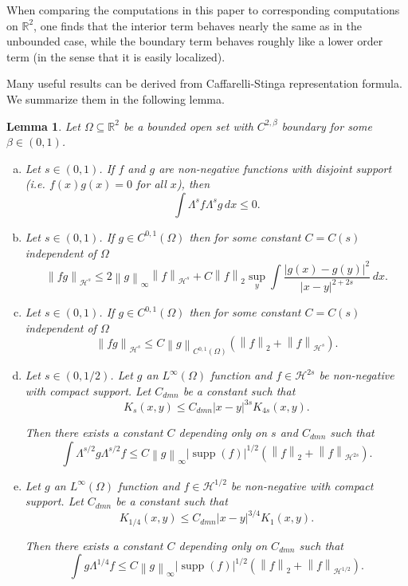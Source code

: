 \documentclass[11pt]{amsart}
\newtheorem{lemma}[theorem]{Lemma}
\theoremstyle{remark}
\theoremstyle{definition}
\newcommand{\R}{\mathbb{R}}
\newcommand{\norm}[1]{\left\lVert#1\right\rVert}
\newcommand{\paren}[1]{\left( #1 \right)}
\DeclareMathOperator{\supp}{supp}
\newcommand{\HD}{\mathcal{H}}
\newcommand{\Comega}{C_\mathit{dmn}}
\begin{document}
When comparing the computations in this paper to corresponding computations on $\R^2$, one finds that the interior term behaves nearly the same as in the unbounded case, while the boundary term behaves roughly like a lower order term (in the sense that it is easily localized).  

Many useful results can be derived from Caffarelli-Stinga representation formula.  We summarize them in the following lemma.  

\begin{lemma} \label{thm:Lambda stuff}
Let $\Omega \subseteq \R^2$ be a bounded open set with $C^{2,\beta}$ boundary for some $\beta \in (0,1)$.  

\begin{enumerate}[(a)]
\item \label{thm:disjoint} Let $s \in (0,1)$.  If $f$ and $g$ are non-negative functions with disjoint support (i.e. $f(x)g(x) = 0$ for all $x$), then 
\[ \int \Lambda^s f \Lambda^s g \,dx \leq 0. \]

\item \label{thm:product rule} Let $s \in (0,1)$.  If $g \in C^{0,1}(\Omega)$ then for some constant $C = C(s)$ independent of $\Omega$
\[ \norm{fg}_{\HD^s} \leq 2 \norm{g}_\infty \norm{f}_{\HD^s} + C \norm{f}_2 \sup_y \int \frac{|g(x)-g(y)|^2}{|x-y|^{2+2s}} \,dx. \]

\item \label{thm:extra product rule} Let $s \in (0,1)$.  If $g \in C^{0,1}(\Omega)$ then for some constant $C=C(s)$ independent of $\Omega$
\[  \norm{fg}_{\HD^s} \leq C \norm{g}_{C^{0,1}(\Omega)} \paren{\norm{f}_2 + \norm{f}_{\HD^s}}. \]

\item \label{thm:L1 of Lambda bounded} Let $s\in(0,1/2)$.  Let $g$ an $L^\infty(\Omega)$ function and $f \in \HD^{2s}$ be non-negative with compact support.  Let $\Comega$ be a constant such that
\begin{equation} \label{K bounded between orders} K_s(x,y) \leq \Comega |x-y|^{3s} K_{4s}(x,y). \end{equation}

Then there exists a constant $C$ depending only on $s$ and $\Comega$ such that
\[ \int \Lambda^{s/2} g \Lambda^{s/2} f \leq C \norm{g}_\infty |\supp(f)|^{1/2} \paren{ \norm{f}_2 + \norm{f}_{\HD^{2s}}}. \]

\item \label{thm:L1 of Lambda1/4 bounded} Let $g$ an $L^\infty(\Omega)$ function and $f \in \HD^{1/2}$ be non-negative with compact support.  Let $\Comega$ be a constant such that
\[ K_{1/4}(x,y) \leq \Comega |x-y|^{3/4} K_{1}(x,y). \]

Then there exists a constant $C$ depending only on $\Comega$ such that
\[ \int g \Lambda^{1/4} f \leq C \norm{g}_\infty |\supp(f)|^{1/2} \paren{ \norm{f}_2 + \norm{f}_{\HD^{1/2}}}. \]

\end{enumerate}
\end{lemma}
\end{document}
